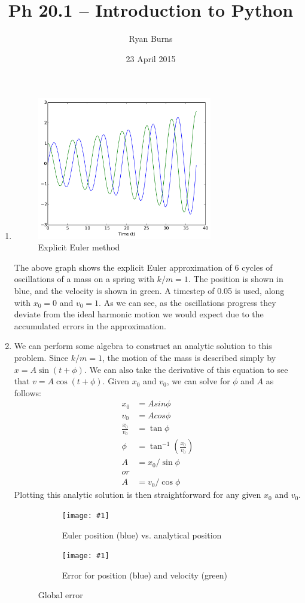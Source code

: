 \documentclass[11pt]{article}
\title{Ph 20.1 -- Introduction to Python}
\author{Ryan Burns}
\date{23 April 2015}
\newcommand{\medgraph}[2]
{\begin{subfigure}[h]{3in}
	\texttt{[image: \#1]}
	\caption{#2}
	\label{fig:#1}
\end{subfigure}}
\begin{document}
\maketitle
\begin{enumerate}
\item
\begin{figure}[h]
\centering
\includegraphics[width=3in]{img/explicit.pdf}
\caption{Explicit Euler method}
\end{figure}
The above graph shows the explicit Euler approximation of 6 cycles of oscillations of a mass on a spring with $k/m = 1$. The position is shown in blue, and the velocity is shown in green. A timestep of 0.05 is used, along with $x_0 = 0$ and $v_0 = 1$. As we can see, as the oscillations progress they deviate from the ideal harmonic motion we would expect due to the accumulated errors in the approximation.

\item
We can perform some algebra to construct an analytic solution to this problem. Since $k/m = 1$, the motion of the mass is described simply by $x = A \sin (t + \phi)$. We can also take the derivative of this equation to see that $v = A \cos (t + \phi)$. Given $x_0$ and $v_0$, we can solve for $\phi$ and $A$ as follows:
\begin{align*}
x_0 &= A sin \phi \\
v_0 &= A cos \phi \\
\frac{x_0}{v_0} &= \tan \phi \\
\phi &= \tan^{-1} \left( \frac{x_0}{v_0} \right) \\
A &= x_0 / \sin \phi \\
or \\
A &= v_0 / \cos \phi
\end{align*}
Plotting this analytic solution is then straightforward for any given $x_0$ and $v_0$.
\begin{figure}[h]
\centering
\medgraph{img/diff.pdf}{Euler position (blue) vs. analytical position}
\medgraph{img/error.pdf}{Error for position (blue) and velocity (green)}
\caption{Global error}
\end{figure}


\end{enumerate}
\end{document}
